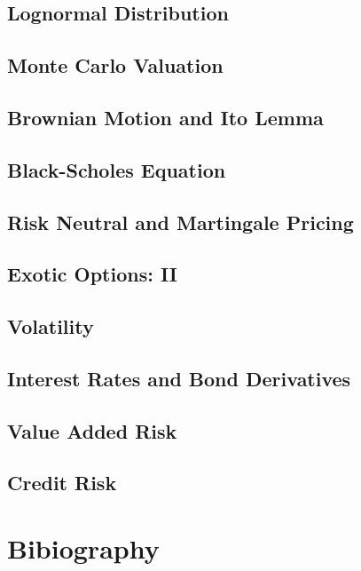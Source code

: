 \documentclass{book}
\theoremstyle{definition}
\theoremstyle{remark}
\begin{document}
\section{Lognormal Distribution}
\section{Monte Carlo Valuation}
\section{Brownian Motion and Ito Lemma}
\section{Black-Scholes Equation}
\section{Risk Neutral and Martingale Pricing}
\section{Exotic Options: II}
\section{Volatility}
\section{Interest Rates and Bond Derivatives}
\section{Value Added Risk}
\section{Credit Risk}



\newpage
\chapter{Bibiography}
\printbibliography
\end{document}

